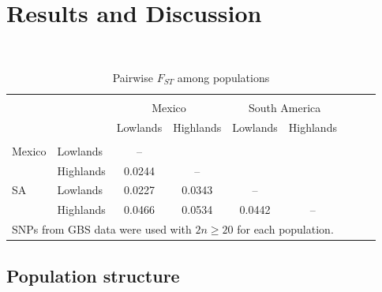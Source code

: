 \section*{Results and Discussion}


\renewcommand{\arraystretch}{1.1}
\begin{table}[tb]

\begin{center}
 \caption[]{Pairwise $F_{ST}$ among populations \hspace*{2.3cm}}
  \textbf{}\\[-2mm]
{\fontsize{7}{9}\sf
    \begin{tabular}{llccccccl}
    \hline
    & & \\[-3mm]
	&		&	\multicolumn{2}{c}{Mexico}		&	\multicolumn{2}{c}{South America}		\\
	&		&	Lowlands	&	Highlands	&	Lowlands	&	Highlands	\\
      \hline
    & & \\[-3mm]
Mexico	&	Lowlands	&	--	&		&		&		\\
	&	Highlands	&	0.0244	&	--	&		&		\\
SA	&	Lowlands	&	0.0227	&	0.0343	&	--	&		\\
	&	Highlands	&	0.0466	&	0.0534	&	0.0442	&	--	\\ [1mm]
    \hline
	\multicolumn{6}{l}{SNPs from GBS data were used with $2n\geq20$ for each population.}
    \end{tabular}
    \label{FstP}  %
}
\end{center}
\end{table}
\renewcommand{\arraystretch}{1}

\subsection*{Population structure}

